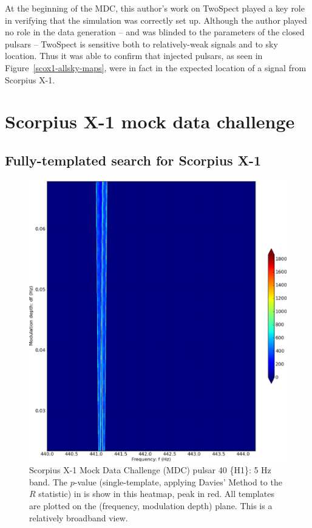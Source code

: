 At the beginning of the MDC, this author's work on TwoSpect played a key role in verifying that the simulation was correctly set up.
Although the author played no role in the data generation -- and was blinded to the parameters of the closed pulsars -- TwoSpect is sensitive both to relatively-weak signals and to sky location.
Thus it was able to confirm that injected pulsars, as seen in Figure~\ref{scox1-allsky-maps}, were in fact in the expected location of a signal from Scorpius X-1.


\section{Scorpius X-1 mock data challenge}
\subsection{Fully-templated search for Scorpius X-1}


\begin{figure}
\begin{center}
\includegraphics[width=0.8\paperwidth,height=0.62\paperheight]{bandH1-bold.eps}
\caption{
Scorpius X-1 Mock Data Challenge (MDC) pulsar 40 \{H1\}: 5 Hz band. 
The $p$-value (single-template, applying Davies' Method to the $R$ statistic) in is show in this heatmap, peak in red. 
All templates are plotted on the (frequency, modulation depth) plane.
This is a relatively broadband view.
}
\label{scox1-wide-heatmap-040}
\end{center}
\end{figure}

